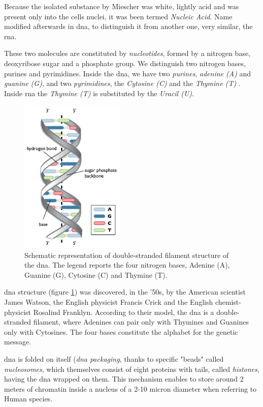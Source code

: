 Because the isolated substance by Miescher was white, lightly acid and was present only into the cells nuclei, it was been termed \textit{Nucleic Acid}.
Name modified afterwards in \gls{dna}, to distinguish it from another one, very similar, the \gls{rna}.

These two molecules are constituted by \textit{nucleotides}, formed by a nitrogen base, deoxyribose sugar and a phosphate group.
We distinguish two nitrogen bases, purines and pyrimidines.
Inside the \gls{dna}, we have two \textit{purines}, \textit{adenine (A)} and \textit{guanine (G)}, and two \textit{pyrimidines}, the \textit{Cytosine (C)} and the \textit{Thymine (T)}  .
Inside \gls{rna} the \textit{Thymine (T)} is substituted by the \textit{Uracil (U)}.

\begin{figure}[h]
\centering
\includegraphics[width=5cm, keepaspectratio]{img/intro/dna1.png}
\caption[the \gls{dna}]{Schematic representation of double-stranded filament structure of the \gls{dna}. The legend reports the four nitrogen bases, Adenine (A), Guanine (G), Cytosine (C) and Thymine (T).}
\label{fig:dna}
\end{figure}

\gls{dna} structure (figure \ref{fig:dna}) was discovered, in the '50s, by the American scientist James Watson, the English physicist Francis Crick and the English chemist-physicist Rosalind Franklyn.
According to their model, the \gls{dna} is a double-stranded filament, where Adenines can pair only with Thymines and Guanines only with Cytosines.
The four bases constitute the alphabet for the genetic message.

\gls{dna} is folded on itself (\textit{\gls{dna} packaging}, thanks to specific "beads" called \textit{nucleosomes}, which themselves consist of eight proteins with tails, called \textit{histones}, having the \gls{dna} wrapped on them.
This mechanism enables to store around 2 meters of chromatin inside a nucleus of a 2-10 micron diameter when referring to Human species.

